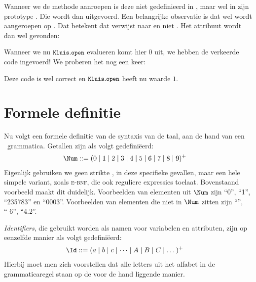 Wanneer we de methode  aanroepen is deze niet gedefinieerd in , maar wel in zijn prototype . Die wordt dan uitgevoerd. Een belangrijke observatie is dat  wel wordt aangeroepen op . Dat betekent dat  verwijst naar  en niet . Het attribuut  wordt dan wel gevonden:

\begin{codelines}
\end{codelines}

Wanneer we nu $\text{\ttfamily\small\upshape Kluis}.\text{\ttfamily\small\upshape open}$ evalueren komt hier $0$ uit, we hebben de verkeerde code ingevoerd! We proberen het nog een keer:

\begin{codelines}
\end{codelines}

Deze code is wel correct en $\text{\ttfamily\small\upshape Kluis}.\text{\ttfamily\small\upshape open}$ heeft nu waarde $1$.

\section{Formele definitie}

Nu volgt een formele definitie van de syntaxis van de taal, aan de hand van een \BNF\ grammatica. Getallen zijn als volgt gedefiniëerd:
%
\begin{align*}
  \Num \GrammarDef (0 \mid 1 \mid 2 \mid 3 \mid 4 \mid 5 \mid 6 \mid 7 \mid 8 \mid 9)^+
\end{align*}
%
Eigenlijk gebruiken we geen strikte \BNF, in deze specifieke gevallen, maar een hele simpele variant, zoals \textsc{e-bnf}, die ook reguliere expressies toelaat. Bovenstaand voorbeeld maakt dit duidelijk. Voorbeelden van elementen uit $\Num$ zijn “0”, “1”, “235783” en “0003”. Voorbeelden van elementen die niet in $\Num$ zitten zijn “”, “-6”, “4.2”.

\emph{Identifiers}, die gebruikt worden als namen voor variabelen en attributen, zijn op eenzelfde manier als volgt gedefiniëerd:
%
\begin{align*}
  \Id \GrammarDef (a \mid b \mid c \mid \dots \mid A \mid B \mid C \mid \dots)^+
\end{align*}
%
Hierbij moet men zich voorstellen dat alle letters uit het alfabet in de grammaticaregel staan op de voor de hand liggende manier.

